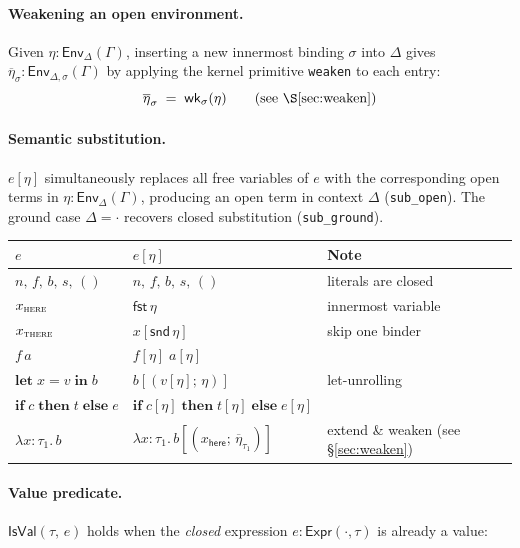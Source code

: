 \documentclass[10pt,a4paper]{article}
\newcommand{\TInt}{\mathsf{Int}}
\newcommand{\TFlt}{\mathsf{Float}}
\newcommand{\TBool}{\mathsf{Bool}}
\newcommand{\TStr}{\mathsf{Str}}
\newcommand{\TUnit}{\mathsf{Unit}}
\newcommand{\IsVal}[2]{\mathsf{IsVal}(#1,\,#2)} %
\newcommand{\subst}[2]{#1[#2]}
\newcommand{\SemEnvD}[2]{\mathsf{Env}_{#1}(#2)}
\newcommand{\klet}{\mathbf{let}}
\newcommand{\kin}{\mathbf{in}}
\newcommand{\kif}{\mathbf{if}}
\newcommand{\kthen}{\mathbf{then}}
\newcommand{\kelse}{\mathbf{else}}
\theoremstyle{plain}
\theoremstyle{definition}
\theoremstyle{remark}
\begin{document}
\paragraph{Weakening an open environment.}
Given $\eta : \SemEnvD{\Delta}{\Gamma}$, inserting a new innermost binding
$\sigma$ into $\Delta$ gives $\overline{\eta}_\sigma : \SemEnvD{\Delta,\sigma}{\Gamma}$
by applying the kernel primitive \texttt{weaken} to each entry:
\[
  \overline{\eta}_\sigma \;=\; \mathsf{wk}_\sigma(\eta)
  \qquad\text{(see \S\ref{sec:weaken})}
\]

\paragraph{Semantic substitution.}
$\subst{e}{\eta}$ simultaneously replaces all free variables of $e$ with
the corresponding open terms in $\eta : \SemEnvD{\Delta}{\Gamma}$, producing
an open term in context $\Delta$ (\texttt{sub\_open}).
The ground case $\Delta = \cdot$ recovers closed substitution (\texttt{sub\_ground}).

\begin{center}
\renewcommand{\arraystretch}{1.35}
\begin{tabular}{@{}lll@{}}
\toprule
$e$ & $\subst{e}{\eta}$ & Note \\
\midrule
$n,\,f,\,b,\,s,\,()$ & $n,\,f,\,b,\,s,\,()$ & literals are closed \\
$x_{\textsc{here}}$ & $\mathsf{fst}\,\eta$ & innermost variable \\
$x_{\textsc{there}}$ & $\subst{x}{\mathsf{snd}\,\eta}$ & skip one binder \\
$f\,a$ & $\subst{f}{\eta}\;\subst{a}{\eta}$ & \\
$\klet\;x{=}v\;\kin\;b$
  & $\subst{b}{(\subst{v}{\eta};\,\eta)}$ & let-unrolling \\
$\kif\;c\;\kthen\;t\;\kelse\;e$
  & $\kif\;\subst{c}{\eta}\;\kthen\;\subst{t}{\eta}\;\kelse\;\subst{e}{\eta}$ & \\
$\lambda x{:}\tau_1.\,b$
  & $\lambda x{:}\tau_1.\,\subst{b}{(x_\mathsf{here};\,\overline{\eta}_{\tau_1})}$
  & extend \& weaken (see \S\ref{sec:weaken}) \\
\bottomrule
\end{tabular}
\end{center}

\paragraph{Value predicate.}
$\IsVal{\tau}{e}$ holds when the \emph{closed} expression $e : \mathsf{Expr}(\cdot,\tau)$
is already a value:
\end{document}
